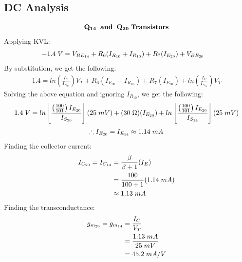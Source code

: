 \documentclass{article}
\begin{document}
	\subsection{DC Analysis}
	\begin{align*}
		\mathbf{Q_{14} \hspace{2mm} and \hspace{2mm} Q_{20}} \hspace{1mm} \textbf{Transistors}
	\end{align*}
	Applying KVL:
	\begin{align*}
		-1.4 \hspace{1mm} V &= V_{BE_{14}} + R_{6}(I_{R_{10}} + I_{R_{10}}) + R_7 (I_{E_{20}}) + V_{BE_{20}}
	\end{align*}
	By substitution, we get the following:
	\begin{align*}
		1.4 = ln(\frac{I_C}{I_{S_{20}}}) V_T + R_6(I_{E_{20}} + I_{R_{10}}) + R_7 (I_{E_{20}}) + ln(\frac{I_C}{I_{S_{14}}}) V_T
	\end{align*}
	Solving the above equation and ignoring $I_{R_{10}}$, we get the following:
	\begin{align*}
		1.4 \hspace{1mm} V = ln \left[\frac{\left(\frac{100}{101}\right) I_{E_{20}}}{I_{S_{20}}} \right] (25 \hspace{1mm} mV) + (30 \hspace{1mm} \Omega)(I_{E_{20}}) + ln \left[\frac{\left(\frac{100}{101}\right) I_{E_{20}}}{I_{S_{14}}} \right] (25 \hspace{1mm} mV)
	\end{align*}
	\begin{align*}
		\therefore I_{E_{20}} = I_{E_{14}} \approx 1.14 \hspace{1mm} mA
	\end{align*}
	Finding the collector current:
	\begin{align*}
		I_{C_{20}} = I_{C_{14}} &= \frac{\beta}{\beta + 1} (I_{E})\\ 
		&= \frac{100}{100 + 1}(1.14 \hspace{1mm} mA)\\ 
		&\approx 1.13 \hspace{1mm} mA
	\end{align*}
	Finding the transconductance:
	\begin{align*}
		g_{m_{20}} = g_{m_{14}} &= \frac{I_C}{V_T}\\ 
		&= \frac{1.13 \hspace{1mm} mA}{25 \hspace{1mm} mV}\\
		&= 45.2 \hspace{1mm} mA/V
	\end{align*}
\end{document}
